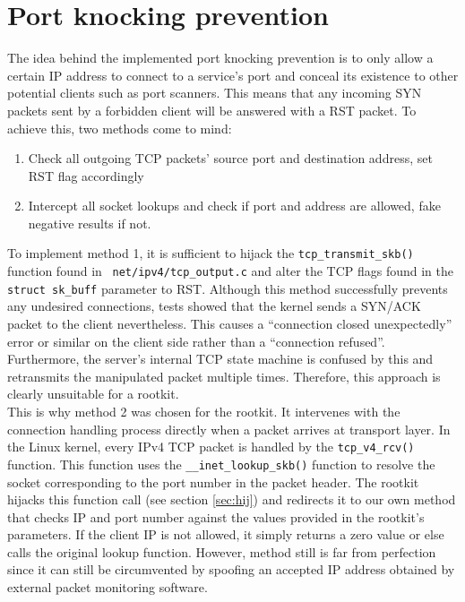 \section{Port knocking prevention}
The idea behind the implemented port knocking prevention is to only allow a 
certain IP address to connect to a service's port and conceal its existence to 
other potential clients such as port scanners. 
This means that any incoming SYN packets sent by a forbidden client will be 
answered with a RST packet. To achieve this,
two methods come to mind:
\begin{enumerate}
 \item Check all outgoing TCP packets' source port and destination address, set 
RST flag accordingly
 \item Intercept all socket lookups and check if port and address are allowed, 
fake negative results if not.
\end{enumerate}
To implement method 1, it is sufficient to hijack the 
\verb+tcp_transmit_skb()+ function found in ~\texttt{net/ipv4/tcp\_output.c} 
and alter the TCP flags found in the \verb+struct sk_buff+
parameter to RST. Although this method successfully prevents any undesired 
connections, tests showed that the kernel sends a SYN/ACK
packet to the client nevertheless. This causes a ``connection closed 
unexpectedly'' error or similar on the client side rather than a
``connection refused''. Furthermore, the server's internal TCP state machine is 
confused by this and retransmits the manipulated packet
multiple times. Therefore, this approach is clearly unsuitable for a rootkit. 
\\
This is why method 2 was chosen for the rootkit. It intervenes with the 
connection handling process directly when a packet arrives at transport layer.
In the Linux kernel, every IPv4 TCP packet is handled by the 
\texttt{tcp\_v4\_rcv()} function. This 
function uses the \texttt{\_\_inet\_lookup\_skb()} function to resolve the 
socket 
corresponding to the port number in the packet header. The rootkit hijacks this 
function call (see section \ref{sec:hij}) and
redirects it to our own method that checks IP and port number against the values 
provided in the rootkit's parameters. If the client IP
is not allowed, it simply returns a zero value or else calls the original 
lookup 
function.
However, method still is far from perfection since it can still be circumvented 
by spoofing an accepted IP address obtained by external packet monitoring 
software.
